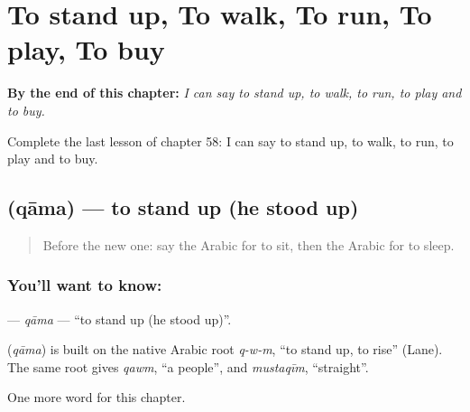 
\chapter{To stand up, To walk, To run, To play, To buy}
\label{ch:ar-to-stand-up-to-walk-to-run-to-play-to-buy}

\begin{chapteropening}
\textbf{By the end of this chapter:} \emph{I can say to stand up, to walk, to run, to play and to buy.}

Complete the last lesson of chapter 58: I can say to stand up, to walk, to run, to play and to buy.
\end{chapteropening}

\section[\texorpdfstring{\ar{قام} (qāma)}{قام (qāma)}]{ (qāma) — to stand up (he stood up)}

\label{lesson:AR-C58-qama}



\begin{quote}
Before the new one: say the Arabic for to sit, then the Arabic for to sleep.
\end{quote}

\subsection*{You'll want to know: }
\textbf{} — \emph{qāma} — \textquotedblleft{}to stand up (he stood up)\textquotedblright{}.

\begin{cousinweb}
\textbf{} (\emph{qāma}) is built on the native Arabic root \emph{q-w-m}, \textquotedblleft{}to stand up, to rise\textquotedblright{} (Lane). The same root gives \emph{qawm}, \textquotedblleft{}a people\textquotedblright{}, and \emph{mustaqīm}, \textquotedblleft{}straight\textquotedblright{}.
\end{cousinweb}

\begin{grammarlens}[title={What you've built}]
One more word for this chapter.
\end{grammarlens}

